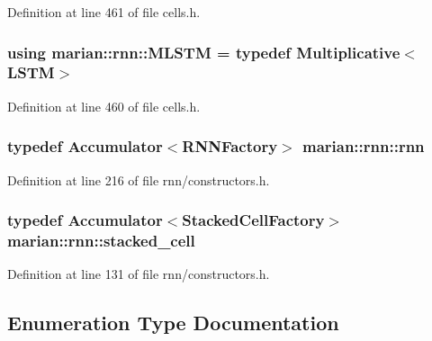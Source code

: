 Definition at line 461 of file cells.\+h.

\subsubsection[{\texorpdfstring{M\+L\+S\+TM}{MLSTM}}]{\setlength{\rightskip}{0pt plus 5cm}using {\bf marian\+::rnn\+::\+M\+L\+S\+TM} = typedef {\bf Multiplicative}$<${\bf L\+S\+TM}$>$}\hypertarget{namespacemarian_1_1rnn_a183afd65ecbacf38477504074a793fa8}{}\label{namespacemarian_1_1rnn_a183afd65ecbacf38477504074a793fa8}


Definition at line 460 of file cells.\+h.

\subsubsection[{\texorpdfstring{rnn}{rnn}}]{\setlength{\rightskip}{0pt plus 5cm}typedef {\bf Accumulator}$<${\bf R\+N\+N\+Factory}$>$ {\bf marian\+::rnn\+::rnn}}\hypertarget{namespacemarian_1_1rnn_aff1b115e415945b445f8d4a2068ec3e8}{}\label{namespacemarian_1_1rnn_aff1b115e415945b445f8d4a2068ec3e8}


Definition at line 216 of file rnn/constructors.\+h.

\subsubsection[{\texorpdfstring{stacked\+\_\+cell}{stacked_cell}}]{\setlength{\rightskip}{0pt plus 5cm}typedef {\bf Accumulator}$<${\bf Stacked\+Cell\+Factory}$>$ {\bf marian\+::rnn\+::stacked\+\_\+cell}}\hypertarget{namespacemarian_1_1rnn_a55385034d5ad19187245bb2b564cb7eb}{}\label{namespacemarian_1_1rnn_a55385034d5ad19187245bb2b564cb7eb}


Definition at line 131 of file rnn/constructors.\+h.



\subsection{Enumeration Type Documentation}
